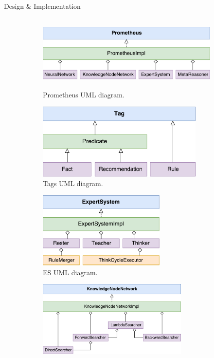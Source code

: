 \documentclass[final]{beamer} %
\begin{document}
\begin{frame}
\begin{columns}
\begin{column}{.34\textwidth}
{\begin{block}{Design \& Implementation}
					\begin{figure}
						\raggedleft
						\begin{subfigure}[b]{0.49\textwidth}
							\centering
							\includegraphics[height=1.5in]{figures/uml_prometheus.pdf}
							\caption{Prometheus UML diagram.}
						\end{subfigure}
						\begin{subfigure}[b]{0.49\textwidth}
							\centering
							\includegraphics[height=1.5in]{figures/uml_tags.pdf}
							\caption{Tags UML diagram.}
						\end{subfigure}
						\par\bigskip
						\begin{subfigure}[b]{0.32\textwidth}
							\centering
							\includegraphics[height=1.5in]{figures/uml_es.pdf}
							\caption{ES UML diagram.}
						\end{subfigure}
						\begin{subfigure}[b]{0.32\textwidth}
							\centering
							\includegraphics[height=1.5in]{figures/uml_knn.pdf}

\end{subfigure}
\end{figure}
\end{block}}
\end{column}
\end{columns}
\end{frame}
\end{document}
